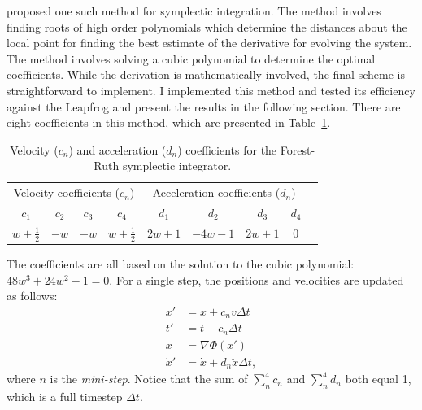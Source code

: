     \citet{1990PhyD...43..105F} proposed one such method for symplectic integration. The method involves finding roots of high order polynomials which determine the distances about the local point for finding the best estimate of the derivative for evolving the system. The method involves solving a cubic polynomial to determine the optimal coefficients. While the derivation is mathematically involved, the final scheme is straightforward to implement. I implemented this method and tested its efficiency against the Leapfrog and present the results in the following section. There are eight coefficients in this method, which are presented in Table~\ref{tab:forest_ruth_coeffs}.
    \begin{table}[h]
        \centering
        \caption[Forest-Ruth coefficients]{Velocity (\(c_n\)) and acceleration (\(d_n\)) coefficients for the Forest-Ruth symplectic integrator.}
        \label{tab:forest_ruth_coeffs}
        \begin{tabular}{ccccc|cccc}
            \multicolumn{4}{c|}{Velocity coefficients (\(c_n\))} & \multicolumn{4}{c}{Acceleration coefficients (\(d_n\))} \\
            $c_1$ & $c_2$ & $c_3$ & $c_4$ & $d_1$ & $d_2$ & $d_3$ & $d_4$ \\
            \hline
            $w + \frac{1}{2}$ & $-w$ & $-w$ & $w + \frac{1}{2}$ & $2w + 1$ & $-4w - 1$ & $2w + 1$ & $0$ \\
        \end{tabular}
    \end{table} 
    The coefficients are all based on the solution to the cubic polynomial: $48 w^3 + 24 w^2 - 1 = 0 $. For a single step, the positions and velocities are updated as follows:
    \begin{align} 
        x' &= x + c_n v \Delta t \\ 
        t' &= t + c_n \Delta t \\ 
        \ddot{x} &= \nabla \Phi (x') \\ 
        \dot{x}' &= \dot{x} + d_n \ddot{x} \Delta t,
    \end{align}
    where $n$ is the \textit{mini-step}. Notice that the sum of $\sum_n^4 c_n$ and $\sum_n^4 d_n$ both equal 1, which is a full timestep $\Delta t$. 

